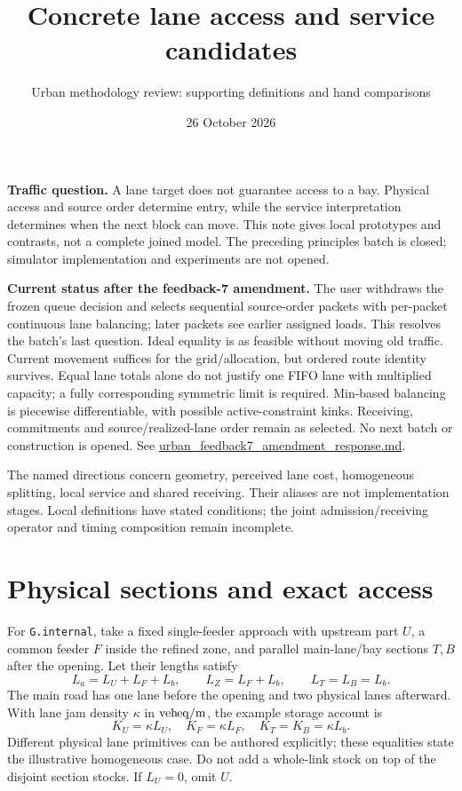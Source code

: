 \documentclass[11pt]{article}
\title{Concrete lane access and service candidates}
\author{Urban methodology review: supporting definitions and hand comparisons}
\date{26 October 2026}
\newcommand{\ve}{\mathrm{veh\!\!\;eq}}
\begin{document}
\maketitle

\textbf{Traffic question.} A lane target does not guarantee access to a bay. Physical access and source order determine entry, while the service interpretation determines when the next block can move. This note gives local prototypes and contrasts, not a complete joined model. The preceding principles batch is closed; simulator implementation and experiments are not opened.

\textbf{Current status after the feedback-7 amendment.} The user withdraws the frozen queue decision and selects sequential source-order packets with per-packet continuous lane balancing; later packets see earlier assigned loads. This resolves the batch's last question. Ideal equality is as feasible without moving old traffic. Current movement suffices for the grid/allocation, but ordered route identity survives. Equal lane totals alone do not justify one FIFO lane with multiplied capacity; a fully corresponding symmetric limit is required. Min-based balancing is piecewise differentiable, with possible active-constraint kinks. Receiving, commitments and source/realized-lane order remain as selected. No next batch or construction is opened. See \url{urban_feedback7_amendment_response.md}.

The named directions concern geometry, perceived lane cost, homogeneous splitting, local service and shared receiving. Their aliases are not implementation stages. Local definitions have stated conditions; the joint admission/receiving operator and timing composition remain incomplete.

\section*{Physical sections and exact access}

For \texttt{G.internal}, take a fixed single-feeder approach with upstream part $U$, a common feeder $F$ inside the refined zone, and parallel main-lane/bay sections $T,B$ after the opening. Let their lengths satisfy
\begin{equation}
 L_a=L_U+L_F+L_b,\qquad L_Z=L_F+L_b,\qquad L_T=L_B=L_b.
\end{equation}
The main road has one lane before the opening and two physical lanes afterward. With lane jam density $\kappa$ in $\ve/{\rm m}$, the example storage account is
\begin{equation}
 K_U=\kappa L_U,\quad K_F=\kappa L_F,\quad K_T=K_B=\kappa L_b.
\end{equation}
Different physical lane primitives can be authored explicitly; these equalities state the illustrative homogeneous case. Do not add a whole-link stock on top of the disjoint section stocks. If $L_U=0$, omit $U$.
\end{document}
